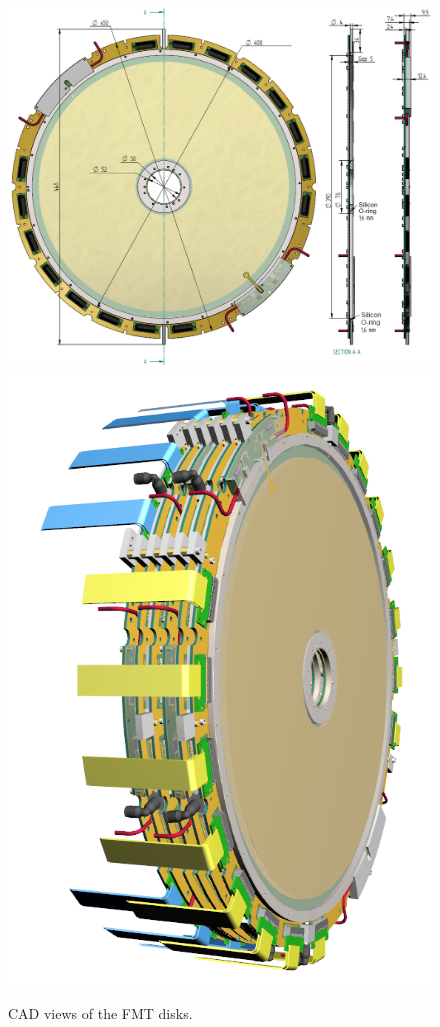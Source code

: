 \begin{figure}[htb]
 
 \begin{center}
\includegraphics[width=1.2\columnwidth,keepaspectratio]{images/fig6_1}
\includegraphics[width=0.6\columnwidth,keepaspectratio]{images/fig6_2}
 \end{center}
 
 \caption{CAD views of the FMT disks.}
 \label{fig:mm-fig5}
\end{figure}

